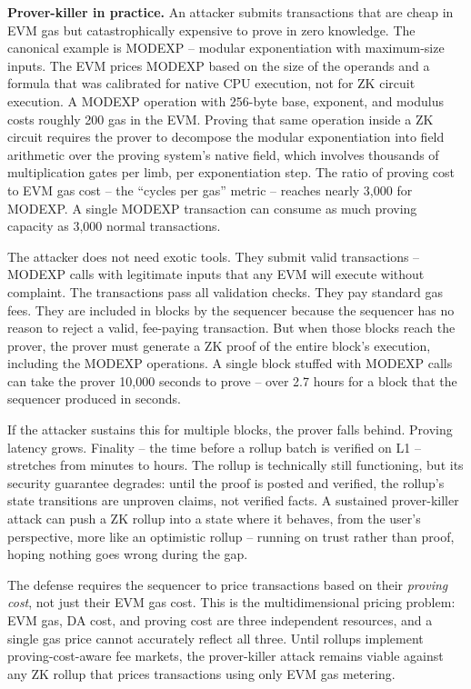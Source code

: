 \documentclass[
  11pt,
  openany]{report}
\renewcommand{\textbf}[1]{{\bfseries\color{MidnightBold}#1}}
\begin{document}
\textbf{Prover-killer in practice.} An attacker submits transactions that are
cheap in EVM gas but catastrophically expensive to prove in zero knowledge. The
canonical example is MODEXP -- modular exponentiation with maximum-size inputs.
The EVM prices MODEXP based on the size of the operands and a formula that was
calibrated for native CPU execution, not for ZK circuit execution. A MODEXP
operation with 256-byte base, exponent, and modulus costs roughly 200 gas in the
EVM. Proving that same operation inside a ZK circuit requires the prover to
decompose the modular exponentiation into field arithmetic over the proving
system's native field, which involves thousands of multiplication gates per
limb, per exponentiation step. The ratio of proving cost to EVM gas cost -- the
``cycles per gas'' metric -- reaches nearly 3,000 for MODEXP. A single MODEXP
transaction can consume as much proving capacity as 3,000 normal transactions.

The attacker does not need exotic tools. They submit valid transactions --
MODEXP calls with legitimate inputs that any EVM will execute without complaint.
The transactions pass all validation checks. They pay standard gas fees. They
are included in blocks by the sequencer because the sequencer has no reason to
reject a valid, fee-paying transaction. But when those blocks reach the prover,
the prover must generate a ZK proof of the entire block's execution, including
the MODEXP operations. A single block stuffed with MODEXP calls can take the
prover 10,000 seconds to prove -- over 2.7 hours for a block that the sequencer
produced in seconds.

If the attacker sustains this for multiple blocks, the prover falls behind.
Proving latency grows. Finality -- the time before a rollup batch is verified on
L1 -- stretches from minutes to hours. The rollup is technically still
functioning, but its security guarantee degrades: until the proof is posted and
verified, the rollup's state transitions are unproven claims, not verified
facts. A sustained prover-killer attack can push a ZK rollup into a state where
it behaves, from the user's perspective, more like an optimistic rollup --
running on trust rather than proof, hoping nothing goes wrong during the gap.

The defense requires the sequencer to price transactions based on their
\emph{proving cost}, not just their EVM gas cost. This is the multidimensional
pricing problem: EVM gas, DA cost, and proving cost are three independent
resources, and a single gas price cannot accurately reflect all three. Until
rollups implement proving-cost-aware fee markets, the prover-killer attack
remains viable against any ZK rollup that prices transactions using only EVM gas
metering.
\end{document}
